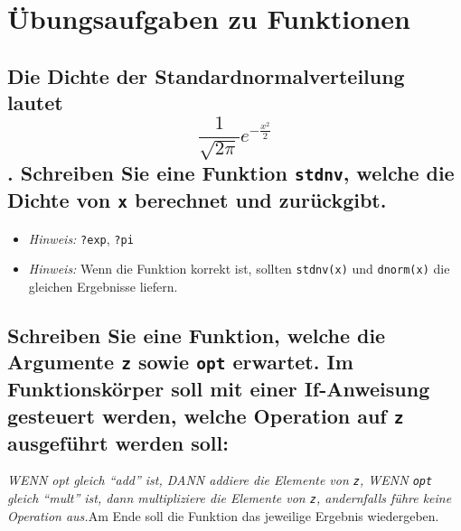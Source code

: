 \documentclass[12pt,a4paper]{article}
\begin{document}
\section{Übungsaufgaben zu
Funktionen}\label{uxfcbungsaufgaben-zu-funktionen}

\subsection{\texorpdfstring{Die Dichte der Standardnormalverteilung
lautet \[\displaystyle \frac{1}{\sqrt{2\pi}} e^{-\frac{x^2}{2}}\].
Schreiben Sie eine Funktion \texttt{stdnv}, welche die Dichte von
\texttt{x} berechnet und
zurückgibt.}{Die Dichte der Standardnormalverteilung lautet \textbackslash displaystyle \textbackslash frac\{1\}\{\textbackslash sqrt\{2\textbackslash pi\}\} e\^{}\{-\textbackslash frac\{x\^{}2\}\{2\}\}. Schreiben Sie eine Funktion stdnv, welche die Dichte von x berechnet und zurückgibt.}}\label{die-dichte-der-standardnormalverteilung-lautet-displaystyle-frac1sqrt2pi-e-fracx22.-schreiben-sie-eine-funktion-stdnv-welche-die-dichte-von-x-berechnet-und-zuruxfcckgibt.}

\begin{itemize}
  \item \textit{Hinweis:} \texttt{?exp}, \texttt{?pi}
  \item \textit{Hinweis:} Wenn die Funktion korrekt ist, sollten \texttt{stdnv(x)} und \texttt{dnorm(x)} die gleichen Ergebnisse liefern.
\end{itemize}

\subsection{\texorpdfstring{Schreiben Sie eine Funktion, welche die
Argumente \texttt{z} sowie \texttt{opt} erwartet. Im Funktionskörper
soll mit einer If-Anweisung gesteuert werden, welche Operation auf
\texttt{z} ausgeführt werden
soll:}{Schreiben Sie eine Funktion, welche die Argumente z sowie opt erwartet. Im Funktionskörper soll mit einer If-Anweisung gesteuert werden, welche Operation auf z ausgeführt werden soll:}}\label{schreiben-sie-eine-funktion-welche-die-argumente-z-sowie-opt-erwartet.-im-funktionskuxf6rper-soll-mit-einer-if-anweisung-gesteuert-werden-welche-operation-auf-z-ausgefuxfchrt-werden-soll}

\emph{WENN opt gleich ``add'' ist, DANN addiere die Elemente von
\texttt{z}, WENN \texttt{opt} gleich ``mult'' ist, dann multipliziere
die Elemente von \texttt{z}, andernfalls führe keine Operation
aus.}\newline\newline Am Ende soll die Funktion das jeweilige Ergebnis
wiedergeben.
\end{document}
